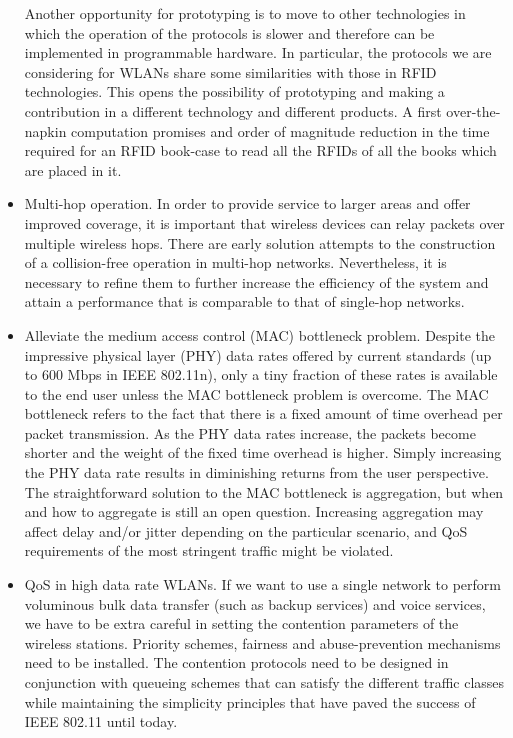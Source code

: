 \documentclass[a4paper,twocolumns]{article}%
\begin{document}
\begin{itemize}
Another opportunity for prototyping is to move to other technologies in which the operation of the protocols is slower and therefore can be implemented in programmable hardware.
In particular, the protocols we are considering for WLANs share some similarities with those in RFID technologies.
This opens the possibility of prototyping and making a contribution in a different technology and different products.
A first over-the-napkin computation promises and order of magnitude reduction in the time required for an RFID book-case to read all the RFIDs of all the books which are placed in it.
\item Multi-hop operation.
In order to provide service to larger areas and offer improved coverage, it is important that wireless devices can relay packets over multiple wireless hops.
There are early solution attempts to the construction of a collision-free operation in multi-hop networks.
Nevertheless, it is necessary to refine them to further increase the efficiency of the system and attain a performance that is comparable to that of single-hop networks.
\item Alleviate the medium access control (MAC) bottleneck problem.
Despite the impressive physical layer (PHY) data rates offered by current standards (up to 600 Mbps in IEEE 802.11n), only a tiny fraction of these rates is available to the end user unless the MAC bottleneck problem is overcome.
The MAC bottleneck refers to the fact that there is a fixed amount of time overhead per packet transmission.
As the PHY data rates increase, the packets become shorter and the weight of the fixed time overhead is higher.
Simply increasing the PHY data rate results in diminishing returns from the user perspective.
The straightforward solution to the MAC bottleneck is aggregation, but when and how to aggregate is still an open question.
Increasing aggregation may affect delay and/or jitter depending on the particular scenario, and QoS requirements of the most stringent traffic might be violated. 
\item QoS in high data rate WLANs. 
If we want to use a single network to perform voluminous bulk data transfer (such as backup services) and voice services, we have to be extra careful in setting the contention parameters of the wireless stations.
Priority schemes, fairness and abuse-prevention mechanisms need to be installed.
The contention protocols need to be designed in conjunction with queueing schemes that can satisfy the different traffic classes while maintaining the simplicity principles that have paved the success of IEEE 802.11 until today.

\end{itemize}
\end{document}
